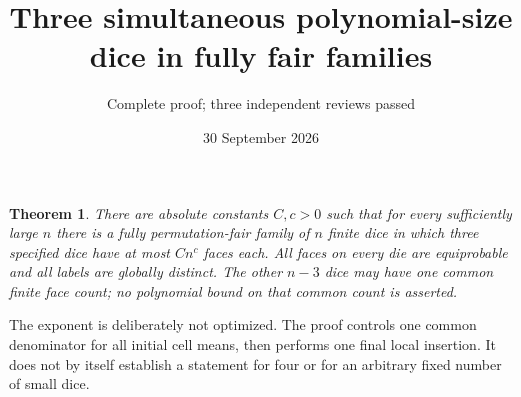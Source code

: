 \documentclass[11pt]{article}
\title{Three simultaneous polynomial-size dice in fully fair families}
\author{Complete proof; three independent reviews passed}\date{30 September 2026}
\newtheorem{theorem}{Theorem}\newtheorem{lemma}{Lemma}
\begin{document}
\maketitle
\begin{theorem}\label{main}
There are absolute constants $C,c>0$ such that for every sufficiently
large $n$ there is a fully permutation-fair family of $n$ finite dice
in which three specified dice have at most $C n^c$ faces each.
All faces on every die are equiprobable and all labels are globally
distinct. The other $n-3$ dice may have one common finite face count;
no polynomial bound on that common count is asserted.
\end{theorem}
The exponent is deliberately not optimized. The proof controls one
common denominator for all initial cell means, then performs one final
local insertion. It does not by itself establish a statement for four
or for an arbitrary fixed number of small dice.
\end{document}

